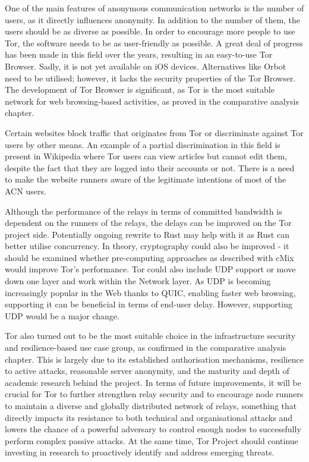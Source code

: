 One of the main features of anonymous communication networks is the number of users, as it directly influences anonymity. In addition to the number of them, the users should be as diverse as possible. In order to encourage more people to use Tor, the software needs to be as user-friendly as possible. A great deal of progress has been made in this field over the years, resulting in an easy-to-use Tor Browser. Sadly, it is not yet available on iOS devices. Alternatives like Orbot need to be utilised; however, it lacks the security properties of the Tor Browser. The development of Tor Browser is significant, as Tor is the most suitable network for web browsing-based activities, as proved in the comparative analysis chapter.

Certain websites block traffic that originates from Tor or discriminate against Tor users by other means. An example of a partial discrimination in this field is present in Wikipedia where Tor users can view articles but cannot edit them, despite the fact that they are logged into their accounts or not. There is a need to make the website runners aware of the legitimate intentions of most of the ACN users.

Although the performance of the relays in terms of committed bandwidth is dependent on the runners of the relays, the delays can be improved on the Tor project side. Potentially ongoing rewrite to Rust may help with it as Rust can better utilise concurrency. In theory, cryptography could also be improved - it should be examined whether pre-computing approaches as described with cMix would improve Tor’s performance. Tor could also include UDP support or move down one layer and work within the Network layer. As UDP is becoming increasingly popular in the Web thanks to QUIC, enabling faster web browsing, supporting it can be beneficial in terms of end-user delay. However, supporting UDP would be a major change.

Tor also turned out to be the most suitable choice in the infrastructure security and resilience-based use case group, as confirmed in the comparative analysis chapter. This is largely due to its established authorisation mechanisms, resilience to active attacks, reasonable server anonymity, and the maturity and depth of academic research behind the project. In terms of future improvements, it will be crucial for Tor to further strengthen relay security and to encourage node runners to maintain a diverse and globally distributed network of relays, something that directly impacts its resistance to both technical and organisational attacks and lowers the chance of a powerful adversary to control enough nodes to successfully perform complex passive attacks. At the same time, Tor Project should continue investing in research to proactively identify and address emerging threats.

